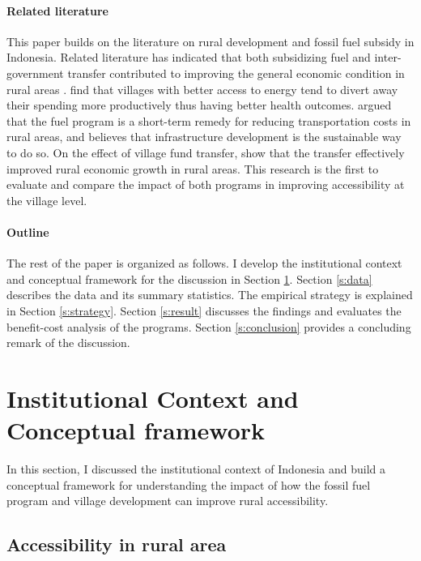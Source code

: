 \documentclass[letterpaper,12pt,leqno]{article}
\begin{document}
\paragraph{Related literature} This paper builds on the literature on rural development and fossil fuel subsidy in Indonesia. Related literature has indicated that both subsidizing fuel and inter-government transfer contributed to improving the general economic condition in rural areas \citep{sambodo_2019,ichsan_2021,hartojo_2022}. \citet{sambodo_2019} find that villages with better access to energy tend to divert away their spending more productively thus having better health outcomes. \citet{ichsan_2021} argued that the fuel program is a short-term remedy for reducing transportation costs in rural areas, and believes that infrastructure development is the sustainable way to do so. On the effect of village fund transfer, \citet{hartojo_2022} show that the transfer effectively improved rural economic growth in rural areas. This research is the first to evaluate and compare the impact of both programs in improving accessibility at the village level.

\paragraph{Outline} The rest of the paper is organized as follows. I develop the institutional context and conceptual framework for the discussion in Section \ref{s:framework}. Section \ref{s:data} describes the data and its summary statistics. The empirical strategy is explained in Section \ref{s:strategy}. Section \ref{s:result} discusses the findings and evaluates the benefit-cost analysis of the programs. Section \ref{s:conclusion} provides a concluding remark of the discussion.

\section{Institutional Context and Conceptual framework}\label{s:framework}

In this section, I discussed the institutional context of Indonesia and build a conceptual framework for understanding the impact of how the fossil fuel program and village development can improve rural accessibility.

\subsection{Accessibility in rural area}
\end{document}
